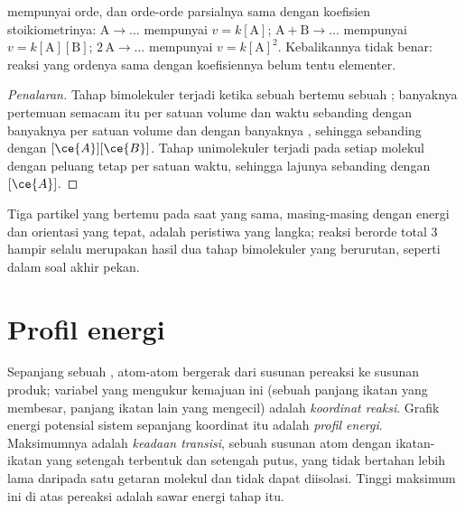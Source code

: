 \begin{proposition}\label{prop:b1:elementary-steps:elementary-law}
 mempunyai orde, dan orde-orde parsialnya sama dengan
koefisien stoikiometrinya: $\mathrm{A} \to \dots$ mempunyai $v = k[\mathrm{A}]$;
$\mathrm{A} + \mathrm{B} \to \dots$ mempunyai $v = k[\mathrm{A}][\mathrm{B}]$;
$2\,\mathrm{A} \to \dots$ mempunyai $v = k[\mathrm{A}]^2$. Kebalikannya
tidak benar: reaksi yang ordenya sama dengan koefisiennya belum tentu
elementer.
\end{proposition}

\begin{proof}[Penalaran]
Tahap bimolekuler terjadi ketika sebuah  bertemu sebuah ;
banyaknya pertemuan semacam itu per satuan volume dan waktu sebanding
dengan banyaknya  per satuan volume dan dengan banyaknya ,
sehingga sebanding dengan $[\ce{A}][\ce{B}]$. Tahap unimolekuler terjadi
pada setiap molekul dengan peluang tetap per satuan waktu, sehingga
lajunya sebanding dengan $[\ce{A}]$.
\end{proof}

\begin{remark}\label{rem:b1:elementary-steps:termolecular}
Tiga partikel yang bertemu pada saat yang sama, masing-masing dengan
energi dan orientasi yang tepat, adalah peristiwa yang langka; reaksi
berorde total 3 hampir selalu merupakan hasil dua tahap bimolekuler yang
berurutan, seperti dalam soal akhir pekan.
\end{remark}

\section{Profil energi}

\begin{definition}\label{def:b1:elementary-steps:energy-profile}
Sepanjang sebuah , atom-atom bergerak dari susunan
pereaksi ke susunan produk; variabel yang mengukur kemajuan ini (sebuah
panjang ikatan yang membesar, panjang ikatan lain yang mengecil) adalah
\emph{koordinat reaksi}. Grafik energi potensial
sistem sepanjang koordinat itu adalah
\emph{profil energi}. Maksimumnya adalah
\emph{keadaan transisi}, sebuah susunan atom dengan ikatan-ikatan yang setengah
terbentuk dan setengah putus, yang tidak bertahan lebih lama daripada
satu getaran molekul dan tidak dapat diisolasi. Tinggi maksimum ini di
atas pereaksi adalah sawar energi tahap itu.
\end{definition}

